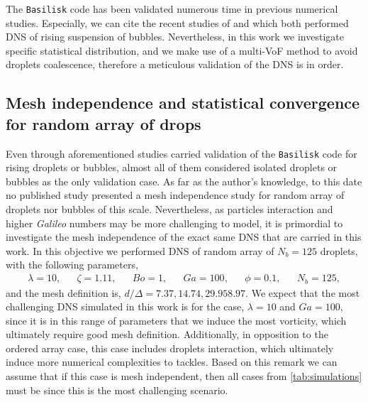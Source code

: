 The \texttt{Basilisk} code has been validated numerous time in previous numerical studies. 
Especially, we can cite the recent studies of \citet{innocenti2020direct} and \citet{hidman2023assessing} which both performed DNS of rising suspension of bubbles. 
Nevertheless, in this work we investigate specific statistical distribution,
and we make use of a multi-VoF method to avoid droplets coalescence, therefore a meticulous validation of the DNS is in order. 


\subsection*{Mesh independence and statistical convergence for random array of drops}

Even through aforementioned studies carried validation of the \texttt{Basilisk} code for rising droplets or bubbles, almost all of them considered isolated droplets or bubbles as the only validation case. 
As far as the author's knowledge, to this date no published study presented a mesh independence study for random array of droplets nor bubbles of this scale. 
Nevertheless, as particles interaction and higher \textit{Galileo} numbers may be more challenging to model, it is primordial to investigate the mesh independence of the exact same DNS that are carried in this work. 
In this objective we performed DNS of random array of $N_b=125$ droplets, with the following parameters,
\begin{align*}
    \lambda = 10,
    && \zeta = 1.11,
    && Bo = 1,
    && Ga = 100,
    && \phi = 0.1,
    && N_b =125,
\end{align*}
and the mesh definition is, $d/\Delta = 7.37, 14.74, 29.9 58.97$. 
We expect that the most challenging DNS simulated in this work is for the case, $\lambda = 10$ and $Ga = 100$, since it is in this range of parameters that we induce the most vorticity, which ultimately require good mesh definition. 
Additionally, in opposition to the ordered array case, this case includes droplets interaction, which ultimately induce more numerical complexities to tackles. 
Based on this remark we can assume that if this case is mesh independent, then all cases from \ref{tab:simulations} must be since this is the most challenging scenario.   

